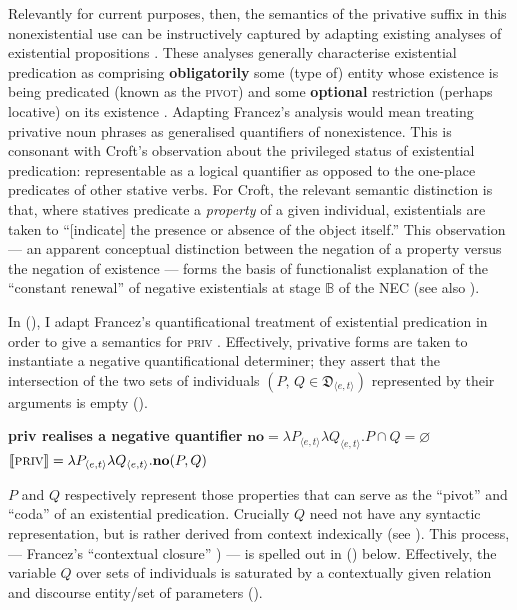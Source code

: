 Relevantly for current purposes, then, the semantics of the privative suffix in this nonexistential use can be instructively captured by adapting existing analyses of existential propositions \citep[\textit{e.g.},][]{Francez2007,McNally2016}. These analyses generally characterise existential predication as comprising \textbf{obligatorily} some (type of) entity whose existence is being predicated (known as the \textsc{pivot)} and some \textbf{optional} restriction (perhaps locative) on its existence \citep[the \textsc{coda}; see][]{Francez2007}. Adapting Francez's analysis would mean treating privative noun phrases as generalised quantifiers of nonexistence. This is consonant with Croft's \citeyearpar[18]{Croft1991} observation about the privileged status of existential predication: representable as a logical quantifier as opposed to the one-place predicates of other stative verbs. For Croft, the relevant semantic distinction is that, where statives predicate a \textit{property} of a given individual, existentials are taken to ``[indicate] the presence or absence of the object itself.''  This observation --- an apparent conceptual distinction between the negation of a property versus the negation of existence --- forms the basis of functionalist explanation of the ``constant renewal'' of negative existentials at stage $\mathbb{B}$ of the NEC (see also \citealt[173]{Veselinova2016}).


In (), I adapt Francez's quantificational treatment of existential predication in order to give a semantics for \textsc{priv} \citep{Francez2007,McNally2011}. Effectively, privative forms are taken to instantiate a negative quantificational determiner; they assert that the intersection of the two sets of individuals $ (P,\,Q\in\mathfrak D_{\langle e,t\rangle} )$ represented by their arguments is empty (\citealp[169]{Barwise1981}).

\pex \textbf{\gls{priv} realises a negative quantifier}
\a$\textbf{no}=\lambda P_{\langle e,t\rangle}\lambda Q_{\langle e,t\rangle}.P\cap Q=\varnothing$%
\a $\llbracket\textsc{priv}\rrbracket=\lambda P_{\langle e,t\rangle}\lambda Q_{\langle e,t\rangle}.\textbf{no}(P,Q)$\xe


$ P $ and $ Q $ respectively represent those properties that can serve as the ``pivot'' and ``coda'' of an existential predication. Crucially $ Q $ need not have any syntactic representation, but is rather derived from context indexically (see ). This process, --- Francez's ``contextual closure'' \citeyearpar[72]{Francez2007}) --- is spelled out in () below. Effectively, the variable $ Q $ over sets of individuals is saturated by a contextually given relation and discourse entity/set of parameters ().

